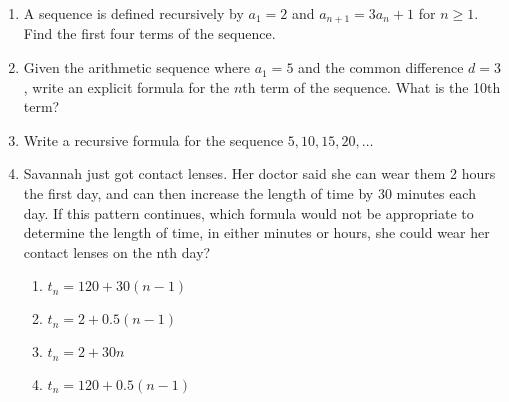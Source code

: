 \documentclass[12pt, twoside]{article}
\begin{document}
\begin{enumerate}[itemsep=0.5cm]
\item A sequence is defined recursively by $ a_1 = 2 $ and $ a_{n+1} = 3a_n + 1 $ for $ n \geq 1 $. Find the first four terms of the sequence. \vspace{2cm}

\item Given the arithmetic sequence where $ a_1 = 5 $ and the common difference $ d = 3 $, write an explicit formula for the $n$th term of the sequence. What is the 10th term?


\newpage
\item Write a recursive formula for the sequence $5, 10, 15, 20, \dots$ \vspace{2cm}


\item Savannah just got contact lenses. Her doctor said she can wear them 2 hours the first day, and can then increase the length of time by 30 minutes each day. If this pattern continues, which formula would not be appropriate to determine the length of time, in either minutes or hours, she could wear her contact lenses on the nth day?
\begin{enumerate}
    \item $t_n = 120 + 30(n-1)$
    \item $t_n = 2 + 0.5(n-1)$
    \item $t_n = 2 + 30n$
    \item $t_n = 120 + 0.5(n-1)$
\end{enumerate}


\end{enumerate}
\end{document}
